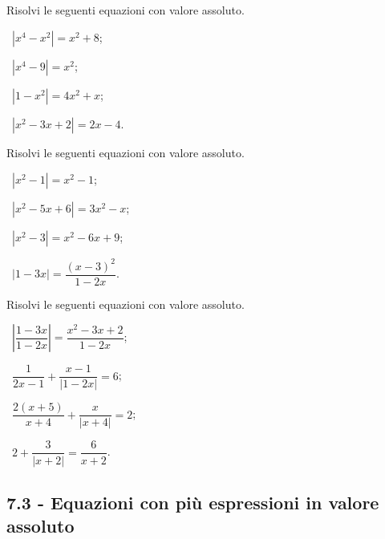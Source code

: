 \begin{esercizio}[\Ast]
 \label{ese:7.14}
Risolvi le seguenti equazioni con valore assoluto.
\begin{multicols}{2}
 \begin{enumeratea}
 \item~$\left|x^4-x^2\right|=x^2+8$;
 \item~$\left|x^4-9\right|=x^2$;
 \item~$\left|1-x^2\right|=4x^2+x$;
 \item~$\left|x^2-3x+2\right|=2x-4$.
 \end{enumeratea}
 \end{multicols}
\end{esercizio}

\begin{esercizio}[\Ast]
 \label{ese:7.15}
Risolvi le seguenti equazioni con valore assoluto.
\begin{multicols}{2}
 \begin{enumeratea}
 \item~$\left|x^2-1\right|=x^2-1$;
 \item~$\left|x^2-5x+6\right|=3x^2-x$;
 \item~$\left|x^2-3\right|=x^2-6x+9$;
 \item~$\left|1-3x\right|=\dfrac{(x-3)^2}{1-2x}$.
 \end{enumeratea}
 \end{multicols}
\end{esercizio}

\begin{esercizio}[\Ast]
 \label{ese:7.16}
Risolvi le seguenti equazioni con valore assoluto.
\begin{multicols}{2}
 \begin{enumeratea}
 \item~$\left|\dfrac{1-3x}{1-2x}\right|=\dfrac{x^2-3x+2}{1-2x}$;
 \item~$\dfrac{1}{2x-1}+\dfrac{x-1}{\left|1-2x\right|}=6$;
 \item~$\dfrac{2(x+5)}{x+4}+\dfrac{x}{\left|x+4\right|}=2$;
 \item~$2+\dfrac{3}{\left|x+2\right|}=\dfrac{6}{x+2}$.
 \end{enumeratea}
 \end{multicols}
\end{esercizio}

\subsection*{7.3 - Equazioni con più espressioni in valore assoluto}

